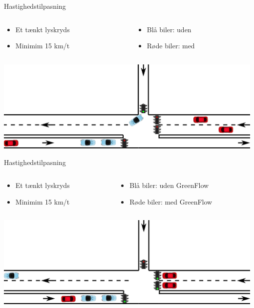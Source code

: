 \begin{frame}{Hastighedstilpasning}
\begin{columns}
\begin{column}{0.4\textwidth}
\begin{itemize}
\item Et tænkt lyskryds
\item Minimim 15 km/t
\end{itemize}
\end{column}
\begin{column}{0.6\textwidth}
\begin{itemize}
\item Blå biler: uden \tech
\item Røde biler: med \tech
\end{itemize}
\end{column}
\end{columns}

\vspace{3mm}
\includegraphics[width=1\textwidth]{../images/introNetworkSimple.png}
\end{frame}

\begin{frame}{Hastighedstilpasning}
\begin{columns}
\begin{column}{0.4\textwidth}
\begin{itemize}
\item Et tænkt lyskryds
\item Minimim 15 km/t
\end{itemize}
\end{column}
\begin{column}{0.6\textwidth}
\begin{itemize}
\item Blå biler: uden GreenFlow
\item Røde biler: med GreenFlow
\end{itemize}
\end{column}
\end{columns}
\vspace{3mm}
\includegraphics[width=1\textwidth]{../images/introNetworkSimple2.png}
\end{frame}

